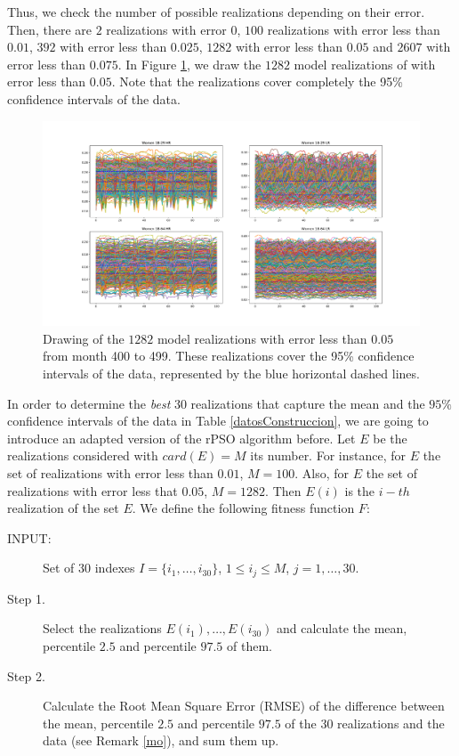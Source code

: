 Thus, we check the number of possible realizations depending on their error. Then, there are $2$ realizations with error $0$,  $100$ realizations with error less than $0.01$, $392$ with error less than $0.025$, $1282$ with error less than $0.05$ and $2607$ with error less than $0.075$. 
In Figure \ref{Error_003}, we draw the $1282$ model realizations of with error less than $0.05$. Note that the realizations cover completely the 95\% confidence intervals of the data. 

\begin{figure}[h!]
	\centering
	\includegraphics[width=\linewidth]{IMGs/1.-Calibrado/Error_005.pdf}
	\caption{Drawing of the $1282$ model realizations with error less than $0.05$ from month 400 to 499. These realizations cover the 95\% confidence intervals of the data, represented by the blue horizontal dashed lines.}
	\label{Error_003}
\end{figure}

In order to determine the \textit{best} $30$ realizations that capture the mean and the $95\%$ confidence intervals of the data in Table \ref{datosConstruccion}, we are going to introduce an adapted version of the rPSO algorithm before. Let $E$ be the realizations considered with $card(E)=M$ its number. For instance, for $E$ the set of realizations with error less than $0.01$, $M=100$. Also, for $E$ the set of realizations with error less that $0.05$, $M=1282$. Then $E(i)$ is the $i-th$ realization of the set $E$. We define the following fitness function $F$:

\begin{description}
	\item[INPUT:] Set of $30$ indexes $I=\{i_1,\ldots,i_{30} \}$, $1\leq i_j \leq M$, $j=1,\ldots, 30$.
	\item[Step 1.] Select the realizations $E(i_1),\ldots,E(i_{30})$ and calculate the mean, percentile $2.5$ and percentile $97.5$ of them.
	\item[Step 2.] Calculate the Root Mean Square Error (RMSE) of the difference between the mean, percentile $2.5$ and percentile $97.5$  of the $30$ realizations and the data (see Remark \ref{mo}), and sum them up. 
\end{description}

